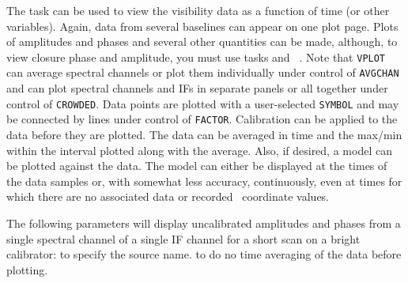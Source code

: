 The task {\tt {}} can be used to view the visibility data as
a function of time (or other variables).  Again, data from several
baselines can appear on one plot page.  Plots of amplitudes and phases
and several other quantities can be made, although, to view closure
phase and amplitude, you must use tasks {\tt {}} and {\tt
{}}\@.  Note that {\tt VPLOT} can average spectral channels
or plot them individually under control of {\tt AVGCHAN} and can plot
spectral channels and IFs in separate panels or all together under
control of {\tt CROWDED}\@.  Data points are plotted with a
user-selected {\tt SYMBOL} and may be connected by lines under control
of {\tt FACTOR}\@.  Calibration can be applied to the data before they
are plotted.  The data can be averaged in time and the max/min within
the interval plotted along with the average.  Also, if desired, a
model can be plotted against the data.  The model can either be
displayed at the times of the data samples or, with somewhat less
accuracy, continuously, even at times for which there are no
associated data or recorded \uv\ coordinate values.

The following parameters will display uncalibrated amplitudes and
phases from a single spectral channel of a single IF channel for a
short scan on a bright calibrator:
 {to specify the source name.}
 {to do no time averaging of the data before
              plotting.}

